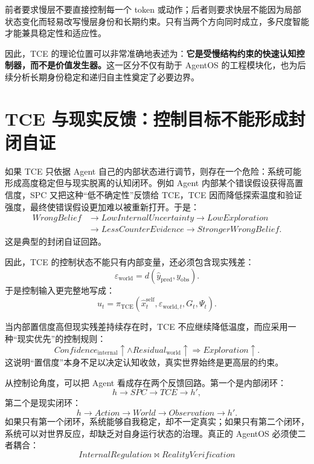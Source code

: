 前者要求慢层不要直接控制每一个 token 或动作；后者则要求快层不能因为局部状态变化而轻易改写慢层身份和长期约束。只有当两个方向同时成立，多尺度智能才能兼具稳定性和适应性。

因此，TCE 的理论位置可以非常准确地表述为：\textbf{它是受慢结构约束的快速认知控制器，而不是价值发生器。}这一区分不仅有助于 AgentOS 的工程模块化，也为后续分析长期身份稳定和递归自主性奠定了必要边界。

\section{TCE 与现实反馈：控制目标不能形成封闭自证}

如果 TCE 只依据 Agent 自己的内部状态进行调节，则存在一个危险：系统可能形成高度稳定但与现实脱离的认知闭环。例如 Agent 内部某个错误假设获得高置信度，SPC 又把这种“低不确定性”反馈给 TCE，TCE 因而降低探索温度和验证强度，最终使错误假设更加难以被重新打开。于是：
\begin{equation}
    \begin{aligned}
    WrongBelief&\rightarrow LowInternalUncertainty\rightarrow LowExploration\\
    &\rightarrow LessCounterEvidence\rightarrow StrongerWrongBelief.
    \end{aligned}
\end{equation}
这是典型的封闭自证回路。

因此，TCE 的控制状态不能只有内部变量，还必须包含现实残差：
\begin{equation}
    \varepsilon_{\mathrm{world}}
    =
    d(
    \hat y_{\mathrm{pred}},
    y_{\mathrm{obs}}
    ).
\end{equation}
于是控制输入更完整地写成：
\begin{equation}
    u_t
    =
    \pi_{\mathrm{TCE}}
    \left(
    \hat x^{\mathrm{self}}_t,
    \varepsilon_{\mathrm{world},t},
    G_t,
    \Psi_t
    \right).
\end{equation}

当内部置信度高但现实残差持续存在时，TCE 不应继续降低温度，而应采用一种“现实优先”的控制规则：
\begin{equation}
    Confidence_{\mathrm{internal}}\uparrow
    \land
    Residual_{\mathrm{world}}\uparrow
    \Rightarrow
    Exploration\uparrow.
\end{equation}
这说明“置信度”本身不足以决定认知收敛，真实世界始终是更高层的约束。

从控制论角度，可以把 Agent 看成存在两个反馈回路。第一个是内部闭环：
\begin{equation}
    h
    \rightarrow
    SPC
    \rightarrow
    TCE
    \rightarrow
    h',
\end{equation}
第二个是现实闭环：
\begin{equation}
    h
    \rightarrow
    Action
    \rightarrow
    World
    \rightarrow
    Observation
    \rightarrow
    h'.
\end{equation}
如果只有第一个闭环，系统能够自我稳定，却不一定真实；如果只有第二个闭环，系统可以对世界反应，却缺乏对自身运行状态的治理。真正的 AgentOS 必须使二者耦合：
\begin{equation}
    \boxed{
    InternalRegulation
    \bowtie
    RealityVerification
    }
\end{equation}

